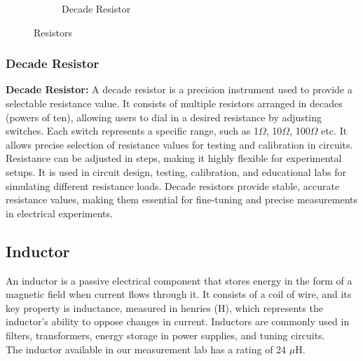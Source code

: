 \documentclass[a4paper,12pt]{article}
\begin{document}
\begin{figure}[H]
\begin{subfigure}[t]{0.49\textwidth}
			\caption{Decade Resistor}
		\end{subfigure}
		
		\caption{Resistors }
		\label{fig:5}
	\end{figure}



	\subsubsection{Decade Resistor}
\textbf{Decade Resistor:} A decade resistor is a precision instrument used to provide a selectable resistance value. It
consists of multiple resistors arranged in decades (powers of ten), allowing users to dial in
a desired resistance by adjusting switches. Each switch represents a specific range, such as
1$\Omega$, 10$\Omega$, 100$\Omega$ etc. It allows precise selection of resistance values for testing and calibration
in circuits. Resistance can be adjusted in steps, making it highly flexible for experimental
setups. It is used in circuit design, testing, calibration, and educational labs for simulating
different resistance loads. Decade resistors provide stable, accurate resistance values, making
them essential for fine-tuning and precise measurements in electrical experiments.


\subsection{Inductor}
An inductor is a passive electrical component that stores energy in the form of a magnetic field when current flows through it. It consists of a coil of wire, and its key property is inductance, measured in henries (H), which represents the inductor’s ability to oppose changes in current. Inductors are commonly used in filters, transformers, energy storage in power supplies, and tuning circuits.\\
The inductor available in our measurement lab has a rating of 24 $\mu$H.
\end{document}
